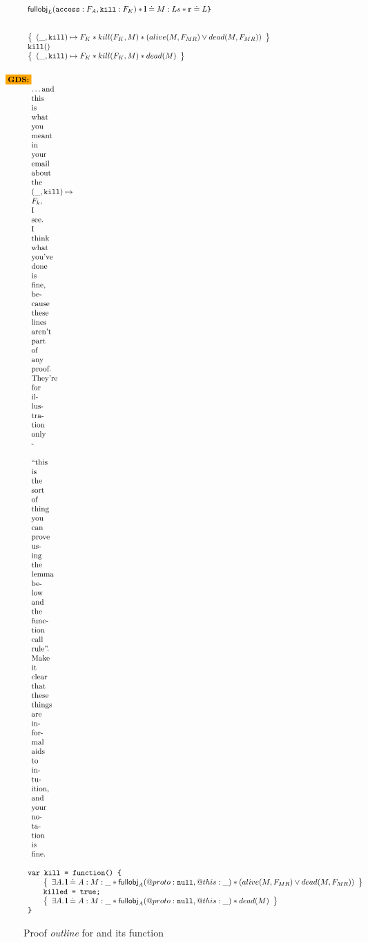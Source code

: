 \documentclass[a4paper,notitlepage]{report}
\begin{document}
\begin{figure}[b]
\[\begin{array}{l}
{{            \fullobj_L(\js{access}:F_A,\js{kill}:F_K) \sep
            \ls \doteq M:Ls \sep
            \rv \doteq L
          }
        }
        \tjs{\}} \\
        \\
        \\
        \logic{
          (\_,\js{kill}) \pointsto F_K \sep kill(F_K,M) \sep (alive(M, F_{MR}) \lor dead(M, F_{MR}))
        } \\
        \js{kill()} \\
        \logic{
          (\_,\js{kill}) \pointsto F_K \sep kill(F_K,M) \sep dead(M)
        } \\
        \gds{\dots and this is what you meant in your email about the $(\_,\js{kill})\pointsto F_k$, I see. I think what you've done is fine, because these lines aren't part of any proof. They're for illustration only - ``this is the sort of thing you can prove using the lemma below and the function call rule''. Make it clear that these things are informal aids to intuition, and your notation is fine.}
        \\
        \tjs{var kill = function() \{} \\
        \indblock{
          \logic{
            \exists A \st \ls \doteq A : M : \_ \sep
            \fullobj_A(@proto: \nil, @this: \_) \sep
            (alive(M, F_{MR}) \lor dead(M, F_{MR}))
          } \\
          \tjs{killed = true;} \\
          \logic{
            \exists A \st \ls \doteq A : M : \_ \sep
            \fullobj_A(@proto: \nil, @this: \_) \sep
            dead(M)
          }
        }
        \tjs{\}}
    \end{array}
  \]
  \caption{Proof \emph{outline} for  and its  function}
\end{figure}
\end{document}
